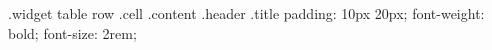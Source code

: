 .widget table row .cell .content .header .title{ 
padding: 10px 20px; 
font-weight: bold; 
font-size: 2rem;
}